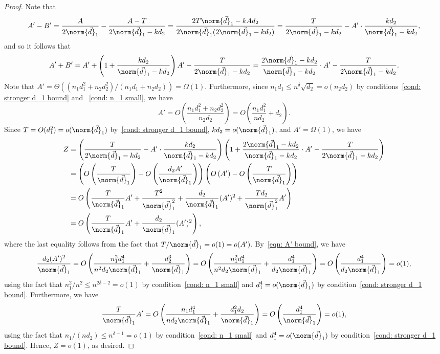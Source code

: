 \documentclass[12pt]{article}
\begin{document}
\begin{proof}
Note that
\[
A' - B' = \frac{A}{2\norm{\vec{d}}_1} - \frac{A-T}{2\norm{\vec{d}}_1 - k d_2} = \frac{2T\norm{\vec{d}}_1 - kA d_2}{2\norm{\vec{d}}_1(2\norm{\vec{d}}_1 - k d_2)} = \frac{T}{2\norm{\vec{d}}_1-k d_2} - A'\cdot\frac{k d_2}{\norm{\vec{d}}_1-k d_2},
\]
and so it follows that
\[
A' + B' = A' + \left(1 +\frac{k d_2}{\norm{\vec{d}}_1-k d_2}\right)A' - \frac{T}{2\norm{\vec{d}}_1-k d_2} = \frac{2\norm{\vec{d}}_1 - k d_2}{\norm{\vec{d}}_1 - k d_2}\cdot A' - \frac{T}{2\norm{\vec{d}}_1-k d_2}.
\]
Note that $A' = \Theta((n_1 d_1^2 + n_2 d_2^2)/(n_1 d_1 + n_2 d_2))= \Omega(1)$. Furthermore, since $n_1 d_1 \leq n^{\delta}\sqrt{d_2} = o(n_2 d_2)$ by conditions~\ref{cond: stronger d_1 bound} and ~\ref{cond: n_1 small}, we have
\begin{equation}
\label{eqn: A' bound}
    A' = O\left(\frac{n_1 d_1^2 +n_2 d_2^2}{n_2 d_2}\right) = O\left(\frac{n_1 d_1^2}{nd_2}+ d_2\right).
\end{equation}
Since $T = O(d_1^2) = o(\norm{\vec{d}}_1)$ by~\ref{cond: stronger d_1 bound}, $k d_2 = o(\norm{\vec{d}}_1)$, and $A'=\Omega(1)$, we have
\begin{align*}
    Z &= \left(\frac{T}{2\norm{\vec{d}}_1-k d_2} - A'\cdot\frac{k d_2}{\norm{\vec{d}}_1-k d_2}\right)\left(1 + \frac{2\norm{\vec{d}}_1 - k d_2}{\norm{\vec{d}}_1 - k d_2}\cdot A' - \frac{T}{2\norm{\vec{d}}_1-k d_2}\right)
    \\
    &= \left(O\left(\frac{T}{\norm{\vec{d}}_1}\right) - O\left(\frac{d_2 A'}{\norm{\vec{d}}_1}\right)\right)\left(O\left(A'\right) - O\left(\frac{T}{\norm{\vec{d}}_1}\right)\right)
    \\
    &= O\left(\frac{T}{\norm{\vec{d}}_1} A'+\frac{T^2}{\norm{\vec{d}}_1^2}+\frac{d_2}{\norm{\vec{d}}_1} (A')^2+\frac{T d_2}{\norm{\vec{d}}_1^2} A'\right)
    \\
    &=O\left(\frac{T}{\norm{\vec{d}}_1} A'+\frac{d_2}{\norm{\vec{d}}_1} (A')^2\right),
\end{align*}
where the last equality follows from the fact that $T/\norm{\vec{d}}_1 = o(1) = o(A')$. By~\eqref{eqn: A' bound},
we have
\[
\frac{d_2 (A')^2}{\norm{\vec{d}}_1} = O\left(\frac{n_1^2 d_1^4}{n^2 d_2\norm{\vec{d}}_1} +\frac{d_2^3}{\norm{\vec{d}}_1}\right) = O\left(\frac{n_1^2 d_1^4}{n^2 d_2\norm{\vec{d}}_1} +\frac{d_1^4}{d_2\norm{\vec{d}}_1}\right) = O\left(\frac{d_1^4}{d_2\norm{\vec{d}}_1}\right) = o(1),
\]
using the fact that $n_1^2/n^2\leq n^{2\delta-2} = o(1)$ by condition~\ref{cond: n_1 small} and $d_1^4 = o(\norm{\vec{d}}_1)$ by condition~\ref{cond: stronger d_1 bound}. Furthermore, we have
\[
\frac{T}{\norm{\vec{d}}_1} A' = O\left(\frac{n_1 d_1^4}{n d_2\norm{\vec{d}}_1} + \frac{d_1^2 d_2}{\norm{\vec{d}}_1}\right) = O\left(\frac{d_1^4}{\norm{\vec{d}}_1}\right) = o(1),
\]
using the fact that $n_1/(nd_2)\leq n^{\delta-1} = o(1)$ by condition~\ref{cond: n_1 small} and $d_1^4 = o(\norm{\vec{d}}_1)$  by condition~\ref{cond: stronger d_1 bound}. Hence, $Z = o(1)$, as desired.
\end{proof}
\end{document}

